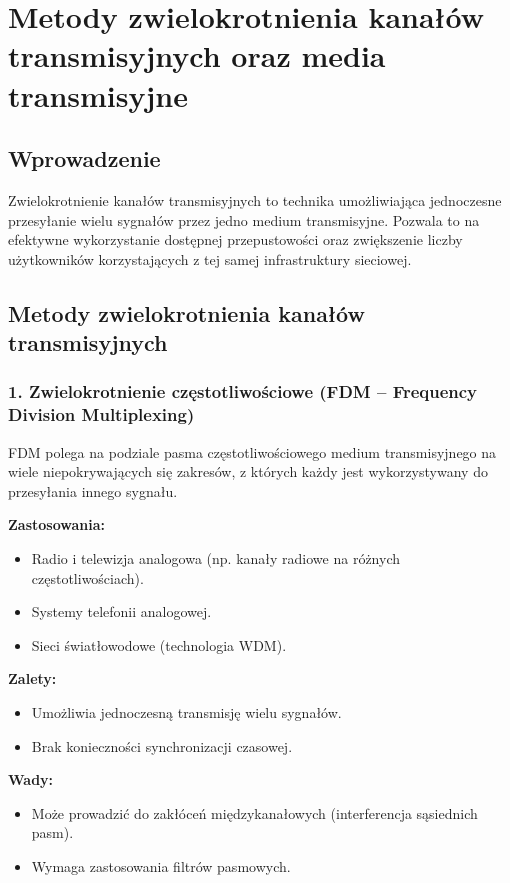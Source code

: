 \section{Metody zwielokrotnienia kanałów transmisyjnych oraz media transmisyjne}

\subsection{Wprowadzenie}
Zwielokrotnienie kanałów transmisyjnych to technika umożliwiająca jednoczesne przesyłanie wielu sygnałów przez jedno medium transmisyjne. Pozwala to na efektywne wykorzystanie dostępnej przepustowości oraz zwiększenie liczby użytkowników korzystających z tej samej infrastruktury sieciowej.

\subsection{Metody zwielokrotnienia kanałów transmisyjnych}

\subsubsection{1. Zwielokrotnienie częstotliwościowe (FDM – Frequency Division Multiplexing)}
FDM polega na podziale pasma częstotliwościowego medium transmisyjnego na wiele niepokrywających się zakresów, z których każdy jest wykorzystywany do przesyłania innego sygnału.

\textbf{Zastosowania:}
\begin{itemize}
    \item Radio i telewizja analogowa (np. kanały radiowe na różnych częstotliwościach).
    \item Systemy telefonii analogowej.
    \item Sieci światłowodowe (technologia WDM).
\end{itemize}

\textbf{Zalety:}
\begin{itemize}
    \item Umożliwia jednoczesną transmisję wielu sygnałów.
    \item Brak konieczności synchronizacji czasowej.
\end{itemize}

\textbf{Wady:}
\begin{itemize}
    \item Może prowadzić do zakłóceń międzykanałowych (interferencja sąsiednich pasm).
    \item Wymaga zastosowania filtrów pasmowych.
\end{itemize}

